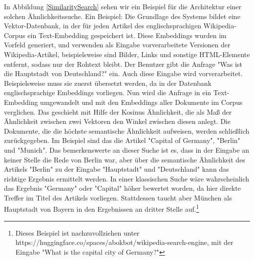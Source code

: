 In Abbildung \ref{SimilaritySearch} sehen wir ein Beispiel für die Architektur einer solchen Ähnlichkeitssuche. Ein Beispiel: Die Grundlage des Systems bildet eine Vektor-Datenbank, in der für jeden Artikel des englischsprachigen Wikipedia-Corpus ein Text-Embedding gespeichert ist. Diese Embeddings wurden im Vorfeld generiert, und verwenden als Eingabe vorverarbeitete Versionen der Wikipedia-Artikel, beispielsweise sind Bilder, Links und sonstige HTML-Elemente entfernt, sodass nur der Rohtext bleibt. Der Benutzer gibt die Anfrage "Was ist die Hauptstadt von Deutschland?" ein. Auch diese Eingabe wird vorverarbeitet. Beispielsweise muss sie zuerst übersetzt werden, da in der Datenbank englischsprachige Embeddings vorliegen. Nun wird die Anfrage in ein Text-Embedding umgewandelt und mit den Embeddings aller Dokumente im Corpus verglichen. Das geschieht mit Hilfe der Kosinus Ähnlichkeit, die als Maß der Ähnlichkeit zwischen zwei Vektoren den Winkel zwischen diesen anlegt. Die Dokumente, die die höchste semantische Ähnlichkeit aufweisen, werden schließlich zurückgegeben. Im Beispiel sind das die Artikel "Capital of Germany", "Berlin" und "Munich". Das bemerkenswerte an dieser Suche ist es, dass in der Eingabe an keiner Stelle die Rede von Berlin war, aber über die semantische Ähnlichkeit des Artikels "Berlin" zu der Eingabe "Hauptstadt" und "Deutschland" kann das richtige Ergebnis ermittelt werden. In einer klassischen Suche wäre wahrscheinlich das Ergebnis "Germany" oder "Capital" höher bewertet worden, da hier direkte Treffer im Titel des Artikels vorliegen. Stattdessen taucht aber München als Hauptstadt von Bayern in den Ergebnissen an dritter Stelle auf.\footnote{Dieses Beispiel ist nachzuvollziehen unter https://huggingface.co/spaces/abokbot/wikipedia-search-engine, mit der Eingabe "What is the capital city of Germany?"}

